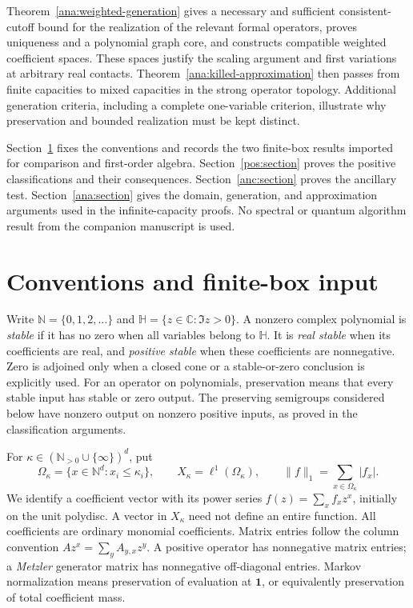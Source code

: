 \documentclass[reqno]{amsart}
\theoremstyle{definition}
\theoremstyle{remark}
\newcommand{\C}{\mathbb C}
\newcommand{\N}{\mathbb N}
\newcommand{\HH}{\mathbb H}
\begin{document}
Theorem~\ref{ana:weighted-generation} gives a necessary and sufficient
consistent-cutoff bound for the realization of the relevant formal
operators, proves uniqueness and a polynomial graph core, and constructs
compatible weighted coefficient spaces. These spaces justify the
scaling argument and first variations at arbitrary real contacts.
Theorem~\ref{ana:killed-approximation} then passes from finite capacities
to mixed capacities in the strong operator topology. Additional
generation criteria, including a complete one-variable criterion,
illustrate why preservation and bounded realization must be kept
distinct.

Section~\ref{pre:section} fixes the conventions and records the two
finite-box results imported for comparison and first-order algebra.
Section~\ref{pos:section} proves the positive classifications and their
consequences. Section~\ref{anc:section} proves the ancillary test.
Section~\ref{ana:section} gives the domain, generation, and approximation
arguments used in the infinite-capacity proofs. No spectral or quantum
algorithm result from the companion manuscript is used.


\section{Conventions and finite-box input}\label{pre:section}

Write \(\N=\{0,1,2,\ldots\}\) and
\(\HH=\{z\in\C:\Im z>0\}\). A nonzero complex polynomial is
\emph{stable} if it has no zero when all variables belong to \(\HH\).
It is \emph{real stable} when its coefficients are real, and
\emph{positive stable} when these coefficients are nonnegative.
Zero is adjoined only when a closed cone or a stable-or-zero conclusion
is explicitly used. For an operator on polynomials, preservation means
that every stable input has stable or zero output. The preserving
semigroups considered below have nonzero output on nonzero positive
inputs, as proved in the classification arguments.

For \(\kappa\in(\N_{>0}\cup\{\infty\})^d\), put
\[
 \Omega_\kappa=\{x\in\N^d:x_i\le\kappa_i\},\qquad
 X_\kappa=\ell^1(\Omega_\kappa),\qquad
 \|f\|_1=\sum_{x\in\Omega_\kappa}|f_x|.
\]
We identify a coefficient vector with its power series
\(f(z)=\sum_x f_xz^x\), initially on the unit polydisc. A vector
in \(X_\kappa\) need not define an entire function. All coefficients
are ordinary monomial coefficients. Matrix entries follow the column
convention \(Az^x=\sum_y A_{y,x}z^y\). A positive operator has
nonnegative matrix entries; a \emph{Metzler} generator matrix has
nonnegative off-diagonal entries. Markov normalization means
preservation of evaluation at \(\boldsymbol1\), or equivalently
preservation of total coefficient mass.
\end{document}
